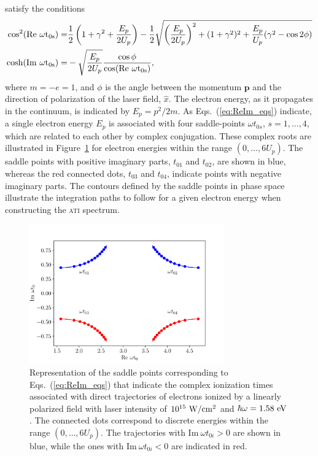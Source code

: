 satisfy the conditions
%
\begin{eqnarray}
  \label{eq:ReIm_eqs}
  \begin{split}
    \cos^{2}(\rm{Re}\ \omega t_{0s}) = & \frac{1}{2}
    \left( 1 + \gamma^{2} + \frac{E_{p}}{2U_{p}} \right)
    - \frac{1}{2}\sqrt{\left( \frac{E_{p}}{2U_{p}} \right)^{2}
    + (1 + \gamma^2)^2 + \frac{E_{p}}{U_{p}}(\gamma^2 - \cos 2\phi)}
    \\
    \cosh(\rm{Im}\ \omega t_{0s}) = & - \sqrt{\frac{E_{p}}{2U_{p}}}
    \frac{\cos\phi}{\cos(\rm{Re}\ \omega t_{0s})},
  \end{split}
\end{eqnarray}
%
where $m = -e = 1$, and $\phi$ is the angle between the momentum
$\mathbf{p}$ and the direction of polarization of the laser field,
$\hat{x}$. The electron energy, as it propagates in the continuum, is
indicated by $E_{p} = p^{2}/2m$. As Eqs.~(\ref{eq:ReIm_eqs}) indicate,
a single electron energy $E_{p}$ is associated with four saddle-points
$\omega t_{0s}$, $s = 1, \dots, 4$, which are related to each other by
complex conjugation.  These complex roots are illustrated in
Figure~\ref{fig:sp_direct} for electron energies within the range $(0,
\dots, 6U_{p})$. The saddle points with positive imaginary parts,
$t_{01}$ and $t_{02}$, are shown in blue, whereas the red connected
dots, $t_{03}$ and $t_{04}$, indicate points with negative imaginary
parts. The contours defined by the saddle points in phase space
illustrate the integration paths to follow for a given electron energy
when constructing the \textsc{ati} spectrum.

\begin{figure}
  \centering
  \includegraphics[width = 0.75\textwidth]{figures/ch_ATI_SPA/direct/spDirectElectrons}
  \caption{Representation of the saddle points corresponding to
    Eqs.~(\ref{eq:ReIm_eqs}) that indicate the complex ionization
    times associated with direct trajectories of electrons ionized by
    a linearly polarized field with laser intensity of
    $10^{15}\ \rm{W/cm^{2}}$ and $\hbar\omega = 1.58\ \rm{eV}$. The
    connected dots correspond to discrete energies within the range
    $(0, \dots, 6 U_{p})$. The trajectories with $\mathrm{Im}\ \omega
    t_{0i} > 0$ are shown in blue, while the ones with
    $\mathrm{Im}\ \omega t_{0i} < 0$ are indicated in red.}
  \label{fig:sp_direct}
\end{figure}

